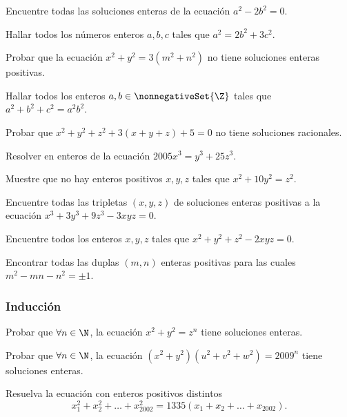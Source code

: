 \begin{exercise}
    Encuentre todas las soluciones enteras de la ecuación $a^2 - 2b^2 = 0$.
\end{exercise}

\begin{exercise}
    Hallar todos los números enteros $a,b,c$ tales que $a^2 = 2b^2 + 3c^2$.
\end{exercise}

\begin{exercise}
    Probar que la ecuación $x^2 + y^2 = 3(m^2 + n^2)$ no tiene soluciones enteras positivas.
\end{exercise}

\begin{exercise}
    Hallar todos los enteros $a,b \in \nonnegativeSet{\Z}$ tales que $a^2 + b^2 + c^2 = a^2 b^2$.
\end{exercise}

\begin{exercise}
    Probar que $x^2+ y^2 + z^2 + 3(x+y+z) + 5 = 0$ no tiene soluciones racionales.
\end{exercise}


\begin{problem}
    Resolver en enteros de la ecuación $2005x^3=y^3+25z^3$.
\end{problem}

\begin{problem}
    Muestre que no hay enteros positivos $x,y,z$ tales que $x^2+10y^2=z^2$.
\end{problem}

\begin{problem}
    Encuentre todas las tripletas $(x,y,z)$ de soluciones enteras positivas a la ecuación $x^3 + 3y^3 + 9z^3 - 3xyz = 0$.
\end{problem}

\begin{problem}
    Encuentre todos los enteros $x,y,z$ tales que $x^2+y^2+z^2-2xyz=0$.
\end{problem}

\begin{problem}
    Encontrar todas las duplas $(m,n)$ enteras positivas para las cuales $m^2 - mn - n^2 = \pm 1$.
\end{problem}

\subsubsection{Inducción}

\begin{problem}
    Probar que $\forall n \in \N$, la ecuación $x^2 + y^2 = z^n$ tiene soluciones enteras.
\end{problem}

\begin{problem}
    Probar que $\forall n \in \N$, la ecuación $(x^2 + y^2)(u^2 + v^2 + w^2) = 2009^n$ tiene soluciones enteras.
\end{problem}

\begin{problem}
    Resuelva la ecuación con enteros positivos distintos
    \[
        x_1^2 + x_2^2 + \dots + x_{2002}^2 = 1335\left(x_1 + x_2 + \dots + x_{2002}\right).
    \]
\end{problem}